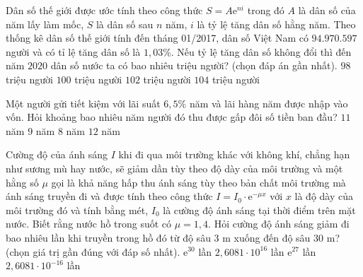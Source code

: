 \begin{ex}%
	Dân số thế giới được ước tính theo công thức $S=A\mathrm{e}^{ni}$ trong đó $A$ là dân số của năm lấy làm mốc, $S$ là dân số sau $n$ năm, $i$ là tỷ lệ tăng dân số hằng năm. Theo thống kê dân số thế giới tính đến tháng 01/2017, dân số Việt Nam có $94.970.597$ người và có tỉ lệ tăng dân số là $1{,}03$\%. Nếu tỷ lệ tăng dân số không đổi thì đến năm $2020$ dân số nước ta có bao nhiêu triệu người? (chọn đáp án gần nhất).
	\choice
	{\True $98$ triệu người}
	{$100$ triệu người}
	{$102$ triệu người}
	{$104$ triệu người}
\end{ex}
\begin{ex}%
	Một người gửi tiết kiệm với lãi suất $6{,}5\%$ năm và lãi hàng năm được nhập vào vốn. Hỏi khoảng bao nhiêu năm người đó thu được gấp đôi số tiền ban đầu?
	\choice
	{\True $11$ năm}
	{$9$ năm}
	{$8$ năm}
	{$12$ năm}
\end{ex}
\begin{ex}%
	Cường độ của ánh sáng $I$ khi đi qua môi trường khác với không khí, chẳng hạn như sương mù hay nước, sẽ giảm dần tùy theo độ dày của môi trường và một hằng số $\mu$ gọi là khả năng hấp thu ánh sáng tùy theo bản chất môi trường mà ánh sáng truyền đi và được tính theo công thức $I=I_0\cdot\mathrm{e}^{-\mu x}$ với $x$ là độ dày của môi trường đó và tính bằng mét, $I_0$ là cường độ ánh sáng tại thời điểm trên mặt nước. Biết rằng nước hồ trong suốt có $\mu=1{,}4$. Hỏi cường độ ánh sáng giảm đi bao nhiêu lần khi truyền trong hồ đó từ độ sâu $3$ m xuống đến độ sâu $30$ m? (chọn giá trị gần đúng với đáp số nhất).
	\choice
	{$\mathrm{e}^{30}$ lần}
	{\True $2{,}6081\cdot 10^{16}$ lần}
	{$\mathrm{e}^{27}$ lần}
	{$2{,}6081\cdot 10^{-16}$ lần}
\end{ex}
